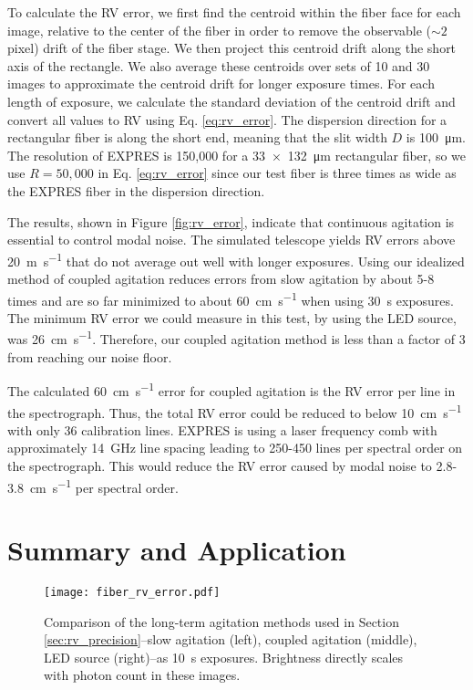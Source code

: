 \documentclass[twocolumn]{emulateapj}
\begin{document}
To calculate the RV error, we first find the centroid within the fiber face for each image, relative to the center of the fiber in order to remove the observable ($\sim 2$ pixel) drift of the fiber stage. We then project this centroid drift along the short axis of the rectangle. We also average these centroids over sets of 10 and 30 images to approximate the centroid drift for longer exposure times. For each length of exposure, we calculate the standard deviation of the centroid drift and convert all values to RV using Eq. \ref{eq:rv_error}. The dispersion direction for a rectangular fiber is along the short end, meaning that the slit width $D$ is \SI{100}{\micro\meter}. The resolution of EXPRES is 150,000 for a \SI{33x132}{\micro\meter} rectangular fiber, so we use $R=50,000$ in Eq. \ref{eq:rv_error} since our test fiber is three times as wide as the EXPRES fiber in the dispersion direction.

The results, shown in Figure \ref{fig:rv_error}, indicate that continuous agitation is essential to control modal noise. The simulated telescope yields RV errors above \SI{20}{\meter\per\second} that do not average out well with longer exposures. Using our idealized method of coupled agitation reduces errors from slow agitation by about 5-8 times and are so far minimized to about \SI{60}{\centi\meter\per\second} when using \SI{30}{\second} exposures. The minimum RV error we could measure in this test, by using the LED source, was \SI{26}{\centi\meter\per\second}. Therefore, our coupled agitation method is less than a factor of 3 from reaching our noise floor.

The calculated \SI{60}{\centi\meter\per\second} error for coupled agitation is the RV error per line in the spectrograph. Thus, the total RV error could be reduced to below \SI{10}{\centi\meter\per\second} with only 36 calibration lines. EXPRES is using a laser frequency comb with approximately \SI{14}{\giga\hertz} line spacing leading to 250-450 lines per spectral order on the spectrograph. This would reduce the RV error caused by modal noise to 2.8-\SI{3.8}{\centi\meter\per\second} per spectral order.

\section{Summary and Application}
\label{sec:conclusions}

\begin{figure}
\centering
	\texttt{[image: fiber\_rv\_error.pdf]}
	\caption{Comparison of the long-term agitation methods used in Section \ref{sec:rv_precision}--slow agitation (left), coupled agitation (middle), LED source (right)--as \SI{10}{\second} exposures. Brightness directly scales with photon count in these images.}
\label{fig:fiber_rv_error}
\end{figure}
\end{document}
